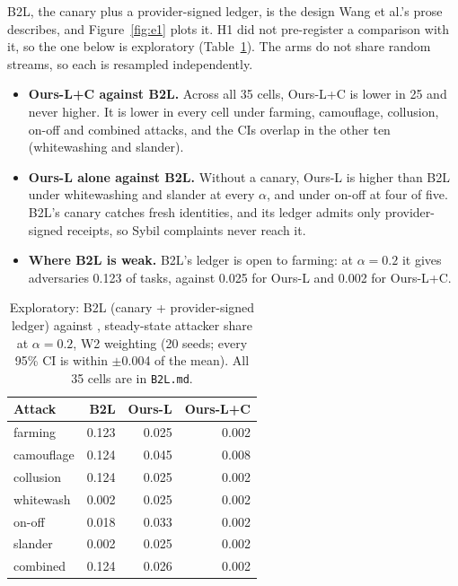 B2L, the canary plus a provider-signed ledger, is the design Wang et al.'s
prose describes, and Figure~\ref{fig:e1} plots it. H1 did not
pre-register a comparison with it, so the one below is exploratory
(Table~\ref{tab:b2l}). The arms do not share random streams, so each is
resampled independently.
\begin{itemize}
\item \textbf{Ours-L+C against B2L.} Across all 35 cells, Ours-L+C is
  lower in 25 and never higher. It is lower in every cell under farming,
  camouflage, collusion, on-off and combined attacks, and the CIs overlap
  in the other ten (whitewashing and slander).
\item \textbf{Ours-L alone against B2L.} Without a canary, Ours-L is
  higher than B2L under whitewashing and slander at every $\alpha$, and
  under on-off at four of five. B2L's canary catches fresh identities,
  and its ledger admits only provider-signed receipts, so Sybil
  complaints never reach it.
\item \textbf{Where B2L is weak.} B2L's ledger is open to farming: at
  $\alpha{=}0.2$ it gives adversaries 0.123 of tasks, against 0.025 for
  Ours-L and 0.002 for Ours-L+C.
\end{itemize}

\begin{table}[t]
\caption{Exploratory: B2L (canary + provider-signed ledger) against
\sys{}, steady-state attacker share at $\alpha{=}0.2$, W2 weighting
(20 seeds; every 95\% CI is within $\pm$0.004 of the mean). All 35 cells
are in \texttt{B2L.md}.}
\label{tab:b2l}
\small
\begin{tabular}{@{}lrrr@{}}
\toprule
Attack & B2L & Ours-L & Ours-L+C \\
\midrule
farming & 0.123 & 0.025 & 0.002 \\
camouflage & 0.124 & 0.045 & 0.008 \\
collusion & 0.124 & 0.025 & 0.002 \\
whitewash & 0.002 & 0.025 & 0.002 \\
on-off & 0.018 & 0.033 & 0.002 \\
slander & 0.002 & 0.025 & 0.002 \\
combined & 0.124 & 0.026 & 0.002 \\
\bottomrule
\end{tabular}
\end{table}

